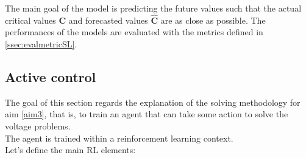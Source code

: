 The main goal of the model is predicting the future values such that the actual critical values $\textbf{C}$ and forecasted values $\hat{\textbf{C}}$ are as close as possible. The performances of the models are evaluated with the metrics defined in \ref{ssec:evalmetricSL}.



\subsection{Active control}
The goal of this section regards the explanation of the solving methodology for aim \ref{aim3}, that is, to train an agent that can take some action to solve the voltage problems.\\

The agent is trained within a reinforcement learning context.\\
Let's define the main \gls{RL} elements:
